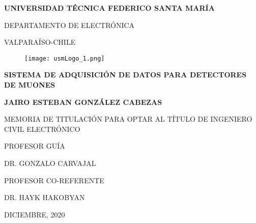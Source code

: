 

\pagestyle{empty}


\begin{center}

\large \textbf{UNIVERSIDAD TÉCNICA FEDERICO SANTA MARÍA}

\vspace{3mm}

\normalsize DEPARTAMENTO DE ELECTRÓNICA

\vspace{3mm}

\normalsize VALPARAÍSO-CHILE

\vspace{4mm}
		\begin{figure}[H]
			\centering
			\texttt{[image: usmLogo\_1.png]}
		\end{figure}
\vspace{2mm}

\Large{\bf SISTEMA DE ADQUISICIÓN DE DATOS PARA DETECTORES DE MUONES}

\vspace{10mm}



\large \textbf{JAIRO ESTEBAN GONZÁLEZ CABEZAS}

\vspace{10mm}

\normalsize
MEMORIA DE TITULACIÓN PARA OPTAR AL TÍTULO DE INGENIERO CIVIL ELECTRÓNICO

\vspace{5mm}

PROFESOR GUÍA


DR. GONZALO CARVAJAL
\vspace{5mm}

PROFESOR CO-REFERENTE


DR. HAYK HAKOBYAN

\vspace{10mm}

DICIEMBRE, 2020


\end{center}



\cleardoublepage

\vspace{50mm}

\begin{flushright}
  {\emph{\\}}
 \vspace{3mm}
  {\emph{\\}}


 
\end{flushright}
\vspace{170mm}
\begin{flushright}
{\emph{\\}}
\end{flushright}
